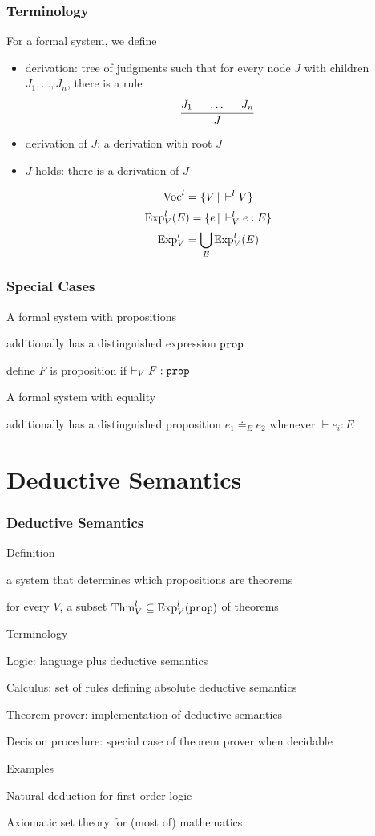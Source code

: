 \begin{frame}\frametitle{Terminology}
For a formal system, we define
\begin{itemize}
\item derivation: tree of judgments such that for every node $J$ with children $J_1,\ldots,J_n$, there is a rule
\[\cfrac{J_1 \hspace*{.5cm} \ldots \hspace*{.5cm} J_n}{J}\,\]
\item derivation of $J$: a derivation with root $J$
\item $J$ holds: there is a derivation of $J$
\end{itemize}
\[\mathrm{Voc}^l = \{V\,|\,\vdash^l V\}\]
\[\mathrm{Exp}^l_V(E) = \{e\,|\,\vdash^l_V e:E\}\]
\[\mathrm{Exp}^l_V = \bigcup_E \mathrm{Exp}^l_V(E)\]
\end{frame}

\begin{frame}\frametitle{Special Cases}
\begin{blockitems}{A formal system with propositions}
\item additionally has a distinguished expression $\prop$
\item define $F$ is proposition if $\vdash_V F:\prop$
\end{blockitems}

\begin{blockitems}{A formal system with equality}
\item additionally has a distinguished proposition $e_1\doteq_E e_2$ whenever $\vdash e_i:E$
\end{blockitems}
\end{frame}

\section{Deductive Semantics}

\begin{frame}\frametitle{Deductive Semantics}
\begin{blockitems}{Definition}
\item a system that determines which propositions are theorems
\item for every $V$, a subset $\Thm^l_V\sq \Exp^l_V(\prop)$ of theorems
\end{blockitems}

\begin{blockitems}{Terminology}
\item Logic: language plus deductive semantics
\item Calculus: set of rules defining absolute deductive semantics
\item Theorem prover: implementation of deductive semantics
\item Decision procedure: special case of theorem prover when decidable
\end{blockitems}

\begin{blockitems}{Examples}
\item Natural deduction for first-order logic
\item Axiomatic set theory for (most of) mathematics
\end{blockitems}
\end{frame}

